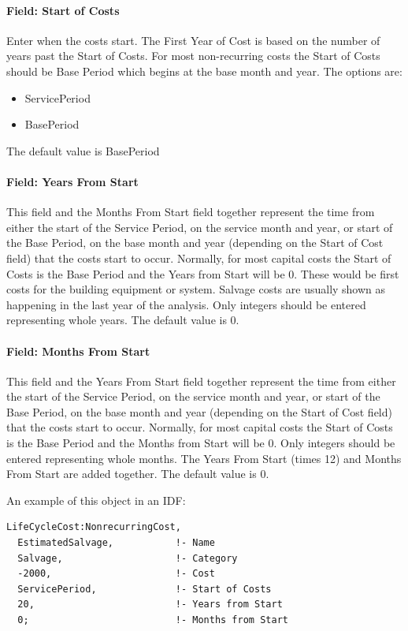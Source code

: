 \paragraph{Field: Start of Costs}\label{field-start-of-costs}

Enter when the costs start. The First Year of Cost is based on the number of years past the Start of Costs. For most non-recurring costs the Start of Costs should be Base Period which begins at the base month and year. The options are:

\begin{itemize}
\item
  ServicePeriod
\item
  BasePeriod
\end{itemize}

The default value is BasePeriod

\paragraph{Field: Years From Start}\label{field-years-from-start}

This field and the Months From Start field together represent the time from either the start of the Service Period, on the service month and year, or start of the Base Period, on the base month and year (depending on the Start of Cost field) that the costs start to occur. Normally, for most capital costs the Start of Costs is the Base Period and the Years from Start will be 0. These would be first costs for the building equipment or system. Salvage costs are usually shown as happening in the last year of the analysis. Only integers should be entered representing whole years. The default value is 0.

\paragraph{Field: Months From Start}\label{field-months-from-start}

This field and the Years From Start field together represent the time from either the start of the Service Period, on the service month and year, or start of the Base Period, on the base month and year (depending on the Start of Cost field) that the costs start to occur. Normally, for most capital costs the Start of Costs is the Base Period and the Months from Start will be 0. Only integers should be entered representing whole months. The Years From Start (times 12) and Months From Start are added together. The default value is 0.

An example of this object in an IDF:

\begin{lstlisting}
LifeCycleCost:NonrecurringCost,
  EstimatedSalvage,           !- Name
  Salvage,                    !- Category
  -2000,                      !- Cost
  ServicePeriod,              !- Start of Costs
  20,                         !- Years from Start
  0;                          !- Months from Start
\end{lstlisting}
